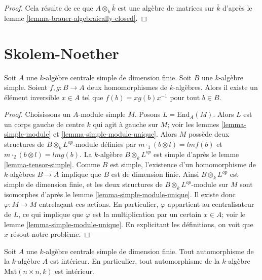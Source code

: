 \begin{proof}
Cela résulte de ce que $A \otimes_k \overline{k}$ est une algèbre de matrices
sur $\overline{k}$ d'après le
lemme \ref{lemma-brauer-algebraically-closed}.
\end{proof}
\section{Skolem-Noether}
\label{section-skolem-noether}



\begin{theorem}
\label{theorem-skolem-noether}
Soit $A$ une $k$-algèbre centrale simple de dimension finie. Soit $B$ une
$k$-algèbre simple. Soient $f, g : B \to A$ deux homomorphismes de $k$-algèbres.
Alors il existe un élément inversible $x \in A$ tel que
$f(b) = xg(b)x^{-1}$ pour tout $b \in B$.
\end{theorem}

\begin{proof}
Choisissons un $A$-module simple $M$. Posons $L = \text{End}_A(M)$.
Alors $L$ est un corps gauche de centre $k$ qui agit à gauche sur $M$; voir les
lemmes \ref{lemma-simple-module} et \ref{lemma-simple-module-unique}.
Alors $M$ possède deux structures de $B \otimes_k L^{op}$-module définies par
$m \cdot_1 (b \otimes l) = lmf(b)$ et $m \cdot_2 (b \otimes l) = lmg(b)$.
La $k$-algèbre $B \otimes_k L^{op}$ est simple d'après le
lemme \ref{lemma-tensor-simple}. Comme $B$ est simple, l'existence d'un
homomorphisme de $k$-algèbres $B \to A$ implique que $B$ est de dimension finie. Ainsi
$B \otimes_k L^{op}$ est simple de dimension finie, et les deux structures de
$B \otimes_k L^{op}$-module sur $M$
sont isomorphes d'après le lemme \ref{lemma-simple-module-unique}.
Il existe donc $\varphi : M \to M$ entrelaçant ces actions.
En particulier, $\varphi$ appartient au centralisateur de $L$, ce qui implique que
$\varphi$ est la multiplication par un certain $x \in A$; voir le
lemme \ref{lemma-simple-module-unique}. En explicitant les définitions, on voit
que $x$ résout notre problème.
\end{proof}

\begin{lemma}
\label{lemma-automorphism-inner}
Soit $A$ une $k$-algèbre centrale simple de dimension finie. Tout automorphisme de la
$k$-algèbre $A$ est intérieur. En particulier, tout automorphisme de la
$k$-algèbre $\text{Mat}(n \times n, k)$
est intérieur.
\end{lemma}

